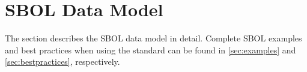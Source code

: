 
\section{SBOL Data Model}\label{sec:model}

The section describes the SBOL data model in detail. Complete SBOL examples and best practices when using the standard can be found in \ref{sec:examples} and \ref{sec:bestpractices}, respectively.





















